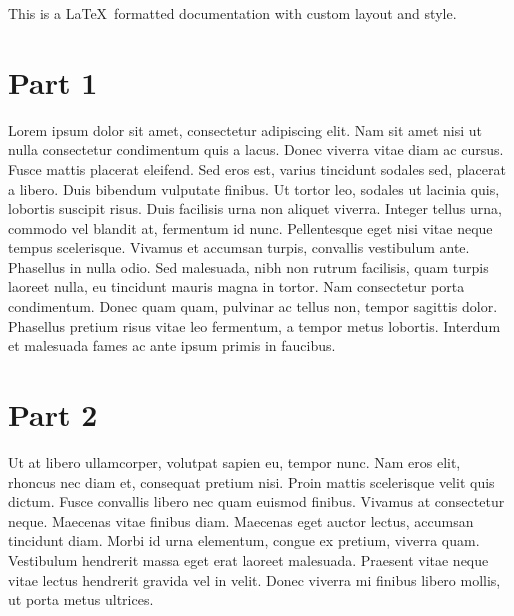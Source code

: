 This is a \LaTeX\ formatted documentation with custom layout and style.

\section{Part 1}

Lorem ipsum dolor sit amet, consectetur adipiscing elit. Nam sit amet nisi ut nulla consectetur condimentum quis a lacus. 
Donec viverra vitae diam ac cursus. Fusce mattis placerat eleifend. Sed eros est, varius tincidunt sodales sed, placerat a libero. 
Duis bibendum vulputate finibus. Ut tortor leo, sodales ut lacinia quis, lobortis suscipit risus. Duis facilisis urna non aliquet viverra. 
Integer tellus urna, commodo vel blandit at, fermentum id nunc. Pellentesque eget nisi vitae neque tempus scelerisque. 
Vivamus et accumsan turpis, convallis vestibulum ante. 
Phasellus in nulla odio. Sed malesuada, nibh non rutrum facilisis, quam turpis laoreet nulla, eu tincidunt mauris magna in tortor. 
Nam consectetur porta condimentum. Donec quam quam, pulvinar ac tellus non, tempor sagittis dolor. 
Phasellus pretium risus vitae leo fermentum, a tempor metus lobortis. Interdum et malesuada fames ac ante ipsum primis in faucibus. 


\section{Part 2}

Ut at libero ullamcorper, volutpat sapien eu, tempor nunc. Nam eros elit, rhoncus nec diam et, consequat pretium nisi. 
Proin mattis scelerisque velit quis dictum. Fusce convallis libero nec quam euismod finibus. Vivamus at consectetur neque. 
Maecenas vitae finibus diam. Maecenas eget auctor lectus, accumsan tincidunt diam. Morbi id urna elementum, congue ex pretium, viverra quam. 
Vestibulum hendrerit massa eget erat laoreet malesuada. 
Praesent vitae neque vitae lectus hendrerit gravida vel in velit. Donec viverra mi finibus libero mollis, ut porta metus ultrices. 